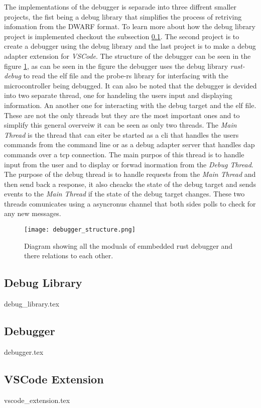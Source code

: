  

The implementations of the debugger is separade into three diffrent smaller projects, the fist being a debug library that simplifies the process of retriving infomation from the \gls{DWARF} format.
To learn more about how the debug library project is implemented checkout the subsection \ref{subsection:rust-debug}.
The second project is to create a debugger using the debug library and the last project is to make a debug adapter extension for \emph{VSCode}.
The structure of the debugger can be seen in the figure \ref{fig:EDBStruct}, as can be seen in the figure the debugger uses the debug library \emph{rust-debug} to read the \gls{elf} file and the probe-rs library for interfacing with the microcontroller being debugged.
It can also be noted that the debugger is devided into two separate thread, one for handeling the users input and displaying information.
An another one for interacting with the debug target and the \gls{elf} file.
These are not the only threads but they are the most important ones and to simplify this general overveiw it can be seen as only two threads.
The \emph{Main Thread} is the thread that can eiter be started as a \gls{cli} that handles the users commands from the command line or as a debug adapter server that handles \acrshort{dap} commands over a \gls{tcp} connection.
The main purpos of this thread is to handle input from the user and to display or forwad inormation from the \emph{Debug Thread}.
The purpose of the debug thread is to handle requests from the \emph{Main Thread} and then send back a response, it also cheacks the state of the debug target and sends events to the \emph{Main Thread} if the state of the debug target changes.
These two threads comunicates using a asyncronus channel that both sides polls to check for any new messages.


\begin{figure}[h]
	\centering
	\texttt{[image: debugger\_structure.png]}
	\caption{Diagram showing all the moduals of emmbedded rust debugger and there relations to each other.}
	\label{fig:EDBStruct}
\end{figure}


\subsection{Debug Library}
\label{subsection:rust-debug}
{debug_library.tex}


\subsection{Debugger}
{debugger.tex}


\subsection{VSCode Extension}
{vscode_extension.tex}

